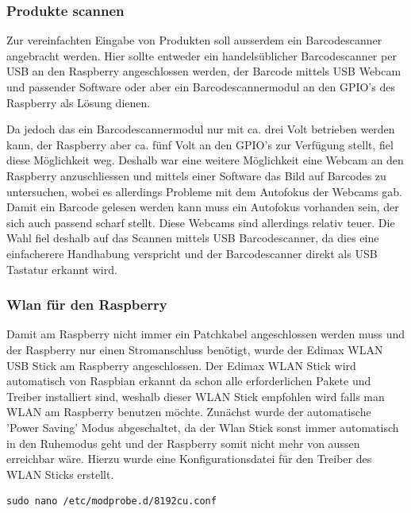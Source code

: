 \documentclass[11pt,a4paper]{article} %
\begin{document}
\subsubsection{Produkte scannen}
Zur vereinfachten Eingabe von Produkten soll ausserdem ein Barcodescanner angebracht werden. Hier sollte entweder ein handelsüblicher Barcodescanner per USB an den Raspberry angeschlossen werden, der Barcode mittels USB Webcam und passender Software oder aber ein Barcodescannermodul an den GPIO's des Raspberry als Lösung dienen.
\par
 Da jedoch das ein Barcodescannermodul nur mit ca. drei Volt betrieben werden kann, der Raspberry aber ca. fünf Volt an den GPIO's zur Verfügung stellt, fiel diese Möglichkeit weg. Deshalb war eine weitere Möglichkeit eine Webcam an den Raspberry anzuschliessen und mittels einer Software das Bild auf Barcodes zu untersuchen, wobei es allerdings Probleme mit dem Autofokus der Webcams gab. Damit ein Barcode gelesen werden kann muss ein Autofokus vorhanden sein, der sich auch passend scharf stellt. Diese Webcams sind allerdings relativ teuer. Die Wahl fiel deshalb auf das Scannen mittels USB Barcodescanner, da dies eine einfacherere Handhabung verspricht und der Barcodescanner direkt als USB Tastatur erkannt wird.
\par
\subsubsection{Wlan für den Raspberry}
Damit am Raspberry nicht immer ein Patchkabel angeschlossen werden muss und der Raspberry nur einen Stromanschluss benötigt, wurde der Edimax WLAN USB Stick\cite{12} am Raspberry angeschlossen. Der Edimax WLAN Stick wird automatisch von Raspbian erkannt da schon alle erforderlichen Pakete und Treiber installiert sind, weshalb dieser WLAN Stick empfohlen wird falls man WLAN am Raspberry benutzen möchte. Zunächst wurde der automatische 'Power Saving' Modus abgeschaltet, da der Wlan Stick sonst immer automatisch in den Ruhemodus geht und der Raspberry somit nicht mehr von aussen erreichbar wäre.
\newpage
Hierzu wurde eine Konfigurationsdatei für den Treiber des WLAN Sticks erstellt.
\begin{frame}

\begin{lstlisting}
sudo nano /etc/modprobe.d/8192cu.conf
\end{lstlisting}

\end{frame}
\par
\end{document}
